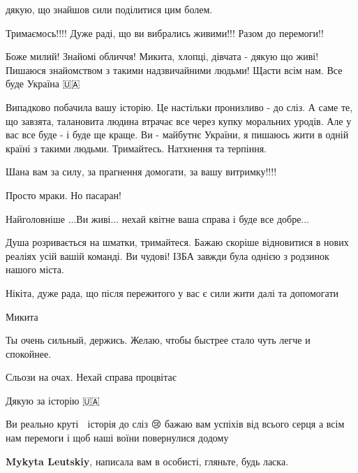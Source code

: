 
 
 
 
 

\qqSecCmt


дякую, що знайшов сили поділитися цим болем.


Тримаємось!!!! Дуже раді, що ви вибрались живими!!! Разом до перемоги!!


Боже милий! Знайомі обличчя! Микита, хлопці, дівчата - дякую що живі! Пишаюся
знайомством з такими надзвичайними людьми! Щасти всім нам. Все буде Україна
🇺🇦💙💛


Випадково побачила вашу історію. Це настільки пронизливо - до сліз. А саме те,
що завзята, талановита людина втрачає все через купку моральних уродів. Але у
вас все буде - і буде ще краще. Ви - майбутнє України, я пишаюсь жити в одній
країні з такими людьми. Тримайтесь. Натхнення та терпіння.


Шана вам за силу, за прагнення домогати, за вашу витримку!!!!


Просто мраки. Но пасаран!


Найголовніше ...Ви живі... нехай квітне ваша справа і буде все добре...


Душа розривається на шматки, тримайтеся. Бажаю скоріше відновитися в нових
реаліях усій вашій команді. Ви чудові! ІЗБА завжди була однією з родзинок
нашого міста.


Нікіта, дуже рада, що після пережитого у вас є сили жити далі та допомогати 🙏


Микита


Ты очень сильный, держись. Желаю, чтобы быстрее стало чуть легче и спокойнее.


Сльози на очах. Нехай справа процвітає


Дякую за історію 🇺🇦


Ви реально круті 💪 історія до сліз 😢 бажаю вам успіхів від всього серця а
всім нам перемоги і щоб наші воїни повернулися додому 💙💛

\textbf{Mykyta Leutskiy}, написала вам в особисті, гляньте, будь ласка.
